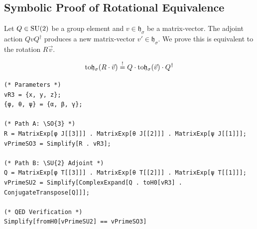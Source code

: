 \subsection{Symbolic Proof of Rotational Equivalence}
Let $Q \in \mathrm{SU}(2)$ be a group element and $v \in \mathfrak{h}_\sigma$ be a matrix-vector. The adjoint action $Q v Q^\dagger$ produces a new matrix-vector $v' \in \mathfrak{h}_\sigma$. We prove this is equivalent to the  rotation $R \vec{v}$.

\begin{equation*}
    \text{to}\mathfrak{h}_\sigma(R \cdot \vec{v}) \mathrel{\stackrel{!}{=}} Q \cdot \text{to}\mathfrak{h}_\sigma(\vec{v}) \cdot Q^\dagger
\end{equation*}

\begin{Verbatim}[frame=single, label=Mathematica]
(* Parameters *)
vR3 = {x, y, z};
{φ, θ, ψ} = {α, β, γ};

(* Path A: \SO{3} *)
R = MatrixExp[φ J[[3]]] . MatrixExp[θ J[[2]]] . MatrixExp[ψ J[[1]]];
vPrimeSO3 = Simplify[R . vR3];

(* Path B: \SU{2} Adjoint *)
Q = MatrixExp[φ T[[3]]] . MatrixExp[θ T[[2]]] . MatrixExp[ψ T[[1]]];
vPrimeSU2 = Simplify[ComplexExpand[Q . toH0[vR3] . ConjugateTranspose[Q]]];

(* QED Verification *)
Simplify[fromH0[vPrimeSU2] == vPrimeSO3] 
\end{Verbatim}
